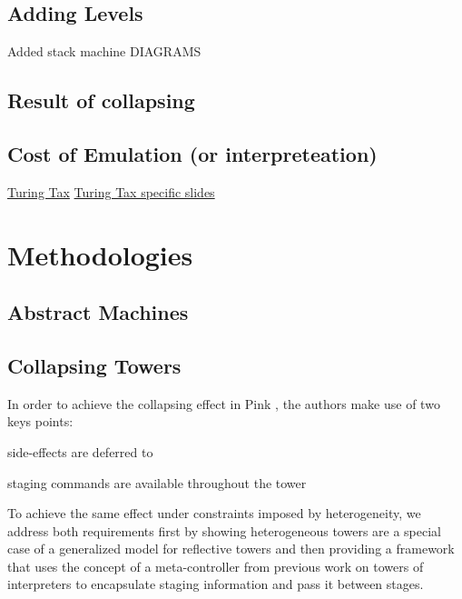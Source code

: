 \documentclass{article}
\theoremstyle{definition}
\begin{document}
\subsection{Adding Levels}
Added stack machine
DIAGRAMS

\subsection{Result of collapsing}

\subsection{Cost of Emulation (or interpreteation)}
\cite{steil2004dynamic}
\href{http://materials.dagstuhl.de/files/17/17061/17061.PaulH.J.Kelly.Slides.pdf}{Turing Tax}
\href{https://www.doc.ic.ac.uk/~phjk/AdvancedCompArchitecture/Lectures/pdfs/Ch01-TuringTaxDiscussionV02.pdf}{Turing Tax specific slides}

\section{Methodologies}
\subsection{Abstract Machines}
\subsection{Collapsing Towers}
In order to achieve the collapsing effect in Pink \cite{amin2017collapsing}, the authors make use of two keys points:
\begin{enumerate*}[label=(\arabic*)]
	\item side-effects are deferred to \mslang
	\item staging commands are available throughout the tower
\end{enumerate*}

To achieve the same effect under constraints imposed by heterogeneity, we address both requirements first by showing heterogeneous towers are a special case of a generalized model for reflective towers and then providing a framework that uses the concept of a meta-controller from previous work on towers of interpreters to encapsulate staging information and pass it between stages.
\end{document}

